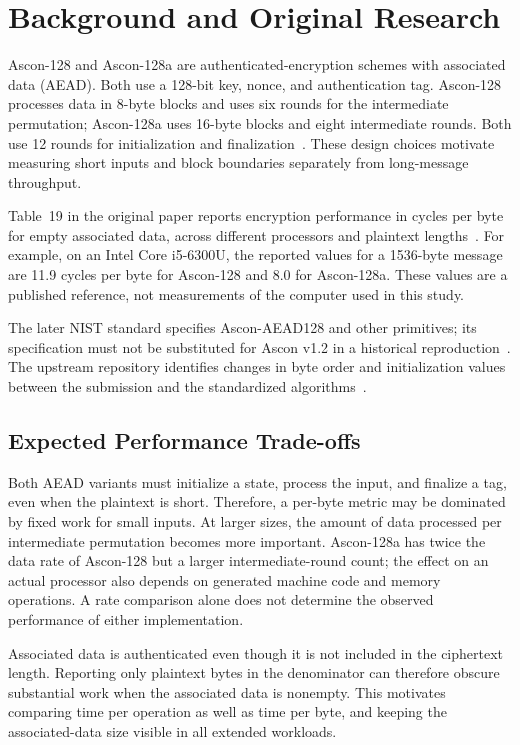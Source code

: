 \documentclass[conference]{IEEEtran}
\begin{document}
\section{Background and Original Research}
Ascon-128 and Ascon-128a are authenticated-encryption schemes with associated
data (AEAD). Both use a 128-bit key, nonce, and authentication tag.
Ascon-128 processes data in 8-byte blocks and uses six rounds for the
intermediate permutation; Ascon-128a uses 16-byte blocks and eight intermediate
rounds. Both use 12 rounds for initialization and finalization~\cite{ascon2021}.
These design choices motivate measuring short inputs and block boundaries
separately from long-message throughput.

Table~19 in the original paper reports encryption performance in cycles per
byte for empty associated data, across different processors and plaintext
lengths~\cite{ascon2021}. For example, on an Intel Core i5-6300U, the reported
values for a 1536-byte message are 11.9 cycles per byte for Ascon-128 and
8.0 for Ascon-128a. These values are a published reference, not measurements
of the computer used in this study.

The later NIST standard specifies Ascon-AEAD128 and other primitives; its
specification must not be substituted for Ascon v1.2 in a historical
reproduction~\cite{nist2025}. The upstream repository identifies changes in
byte order and initialization values between the submission and the
standardized algorithms~\cite{asconstandardrepo}.

\subsection{Expected Performance Trade-offs}
Both AEAD variants must initialize a state, process the input, and finalize a
tag, even when the plaintext is short. Therefore, a per-byte metric may be
dominated by fixed work for small inputs. At larger sizes, the amount of data
processed per intermediate permutation becomes more important. Ascon-128a
has twice the data rate of Ascon-128 but a larger intermediate-round count;
the effect on an actual processor also depends on generated machine code and
memory operations. A rate comparison alone does not determine the observed
performance of either implementation.

Associated data is authenticated even though it is not included in the
ciphertext length. Reporting only plaintext bytes in the denominator can
therefore obscure substantial work when the associated data is nonempty.
This motivates comparing time per operation as well as time per byte, and
keeping the associated-data size visible in all extended workloads.
\end{document}
